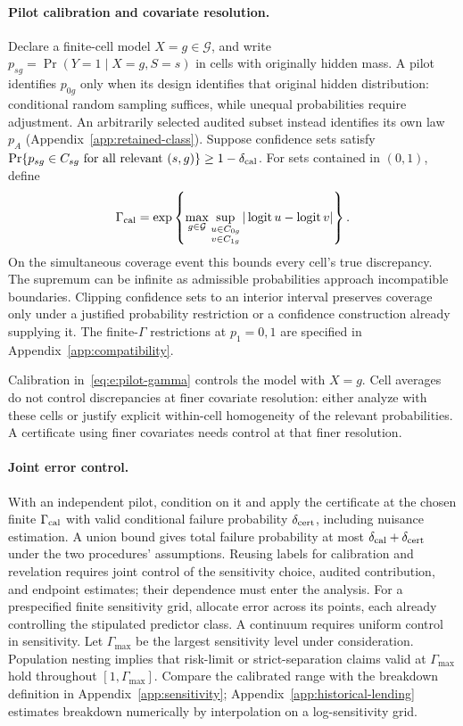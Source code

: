 \paragraph{Pilot calibration and covariate resolution.}
Declare a finite-cell model $X=g\in\mathcal G$, and write $p_{sg}=\Pr(Y=1\mid X=g,S=s)$ in cells with originally hidden mass. A pilot identifies $p_{0g}$ only when its design identifies that original hidden distribution: conditional random sampling suffices, while unequal probabilities require adjustment. An arbitrarily selected audited subset instead identifies its own law $p_A$ (Appendix~\ref{app:retained-class}). Suppose confidence sets satisfy $\Pr\{p_{sg}\in C_{sg}\text{ for all relevant }(s,g)\}\geq1-\delta_{\rm cal}$. For sets contained in $(0,1)$, define
\begin{equation}
\Gamma_{\rm cal}=\exp\left\{\max_{g\in\mathcal G}
\sup_{\substack{u\in C_{0g}\\v\in C_{1g}}}
|\operatorname{logit}u-\operatorname{logit}v|\right\}.
\label{eq:e:pilot-gamma}
\end{equation}
On the simultaneous coverage event this bounds every cell's true discrepancy. The supremum can be infinite as admissible probabilities approach incompatible boundaries. Clipping confidence sets to an interior interval preserves coverage only under a justified probability restriction or a confidence construction already supplying it. The finite-$\Gamma$ restrictions at $p_1=0,1$ are specified in Appendix~\ref{app:compatibility}.

Calibration in~\eqref{eq:e:pilot-gamma} controls the model with $X=g$. Cell averages do not control discrepancies at finer covariate resolution: either analyze with these cells or justify explicit within-cell homogeneity of the relevant probabilities. A certificate using finer covariates needs control at that finer resolution.

\paragraph{Joint error control.}
With an independent pilot, condition on it and apply the certificate at the chosen finite $\Gamma_{\rm cal}$ with valid conditional failure probability $\delta_{\rm cert}$, including nuisance estimation. A union bound gives total failure probability at most $\delta_{\rm cal}+\delta_{\rm cert}$ under the two procedures' assumptions. Reusing labels for calibration and revelation requires joint control of the sensitivity choice, audited contribution, and endpoint estimates; their dependence must enter the analysis. For a prespecified finite sensitivity grid, allocate error across its points, each already controlling the stipulated predictor class. A continuum requires uniform control in sensitivity. Let $\Gamma_{\max}$ be the largest sensitivity level under consideration. Population nesting implies that risk-limit or strict-separation claims valid at $\Gamma_{\max}$ hold throughout $[1,\Gamma_{\max}]$. Compare the calibrated range with the breakdown definition in Appendix~\ref{app:sensitivity}; Appendix~\ref{app:historical-lending} estimates breakdown numerically by interpolation on a log-sensitivity grid.

